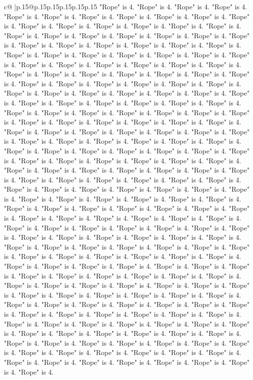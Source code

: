 \documentclass{article}
\begin{document}
{\begin{supertabular}{c@{$\;$}|p{.15\linewidth}@{}p{.15\linewidth}p{.15\linewidth}p{.15\linewidth}p{.15\linewidth}p{.15\linewidth}}
{{{"Rope" is 4. "Rope" is 4. "Rope" is 4. "Rope" is 4. "Rope" is 4. "Rope" is 4. "Rope" is 4. "Rope" is 4. "Rope" is 4. "Rope" is 4. "Rope" is 4. "Rope" is 4. "Rope" is 4. "Rope" is 4. "Rope" is 4. "Rope" is 4. "Rope" is 4. "Rope" is 4. "Rope" is 4. "Rope" is 4. "Rope" is 4. "Rope" is 4. "Rope" is 4. "Rope" is 4. "Rope" is 4. "Rope" is 4. "Rope" is 4. "Rope" is 4. "Rope" is 4. "Rope" is 4. "Rope" is 4. "Rope" is 4. "Rope" is 4. "Rope" is 4. "Rope" is 4. "Rope" is 4. "Rope" is 4. "Rope" is 4. "Rope" is 4. "Rope" is 4. "Rope" is 4. "Rope" is 4. "Rope" is 4. "Rope" is 4. "Rope" is 4. "Rope" is 4. "Rope" is 4. "Rope" is 4. "Rope" is 4. "Rope" is 4. "Rope" is 4. "Rope" is 4. "Rope" is 4. "Rope" is 4. "Rope" is 4. "Rope" is 4. "Rope" is 4. "Rope" is 4. "Rope" is 4. "Rope" is 4. "Rope" is 4. "Rope" is 4. "Rope" is 4. "Rope" is 4. "Rope" is 4. "Rope" is 4. "Rope" is 4. "Rope" is 4. "Rope" is 4. "Rope" is 4. "Rope" is 4. "Rope" is 4. "Rope" is 4. "Rope" is 4. "Rope" is 4. "Rope" is 4. "Rope" is 4. "Rope" is 4. "Rope" is 4. "Rope" is 4. "Rope" is 4. "Rope" is 4. "Rope" is 4. "Rope" is 4. "Rope" is 4. "Rope" is 4. "Rope" is 4. "Rope" is 4. "Rope" is 4. "Rope" is 4. "Rope" is 4. "Rope" is 4. "Rope" is 4. "Rope" is 4. "Rope" is 4. "Rope" is 4. "Rope" is 4. "Rope" is 4. "Rope" is 4. "Rope" is 4. "Rope" is 4. "Rope" is 4. "Rope" is 4. "Rope" is 4. "Rope" is 4. "Rope" is 4. "Rope" is 4. "Rope" is 4. "Rope" is 4. "Rope" is 4. "Rope" is 4. "Rope" is 4. "Rope" is 4. "Rope" is 4. "Rope" is 4. "Rope" is 4. "Rope" is 4. "Rope" is 4. "Rope" is 4. "Rope" is 4. "Rope" is 4. "Rope" is 4. "Rope" is 4. "Rope" is 4. "Rope" is 4. "Rope" is 4. "Rope" is 4. "Rope" is 4. "Rope" is 4. "Rope" is 4. "Rope" is 4. "Rope" is 4. "Rope" is 4. "Rope" is 4. "Rope" is 4. "Rope" is 4. "Rope" is 4. "Rope" is 4. "Rope" is 4. "Rope" is 4. "Rope" is 4. "Rope" is 4. "Rope" is 4. "Rope" is 4. "Rope" is 4. "Rope" is 4. "Rope" is 4. "Rope" is 4. "Rope" is 4. "Rope" is 4. "Rope" is 4. "Rope" is 4. "Rope" is 4. "Rope" is 4. "Rope" is 4. "Rope" is 4. "Rope" is 4. "Rope" is 4. "Rope" is 4. "Rope" is 4. "Rope" is 4. "Rope" is 4. "Rope" is 4. "Rope" is 4. "Rope" is 4. "Rope" is 4. "Rope" is 4. "Rope" is 4. "Rope" is 4. "Rope" is 4. "Rope" is 4. "Rope" is 4. "Rope" is 4. "Rope" is 4. "Rope" is 4. "Rope" is 4. "Rope" is 4. "Rope" is 4. "Rope" is 4. "Rope" is 4. "Rope" is 4. "Rope" is 4. "Rope" is 4. "Rope" is 4. "Rope" is 4. "Rope" is 4. "Rope" is 4. "Rope" is 4. "Rope" is 4. "Rope" is 4. "Rope" is 4. "Rope" is 4. "Rope" is 4. "Rope" is 4. "Rope" is 4. "Rope" is 4. "Rope" is 4. "Rope" is 4. "Rope" is 4. "Rope" is 4. "Rope" is 4. "Rope" is 4. "Rope" is 4. "Rope" is 4. "Rope" is 4. "Rope" is 4. "Rope" is 4. "Rope" is 4. "Rope" is 4. "Rope" is 4. "Rope" is 4. "Rope" is 4. "Rope" is 4. "Rope" is 4. "Rope" is 4. "Rope" is 4. "Rope" is 4. "Rope" is 4. "Rope" is 4. "Rope" is 4. "Rope" is 4. "Rope" is 4. "Rope" is 4. "Rope" is 4. "Rope" is 4. "Rope" is 4. "Rope" is 4. "Rope" is 4. "Rope" is 4. "Rope" is 4. "Rope" is 4. "Rope" is 4. "Rope" is 4. "Rope" is 4. "Rope" is 4. "Rope" is 4. "Rope" is 4. "Rope" is 4. "Rope" is 4. "Rope" is 4. "Rope" is 4. "Rope" is 4. "Rope" is 4. "Rope" is 4. "Rope" is 4. "Rope" is 4. }}}
\end{supertabular}}
\end{document}
